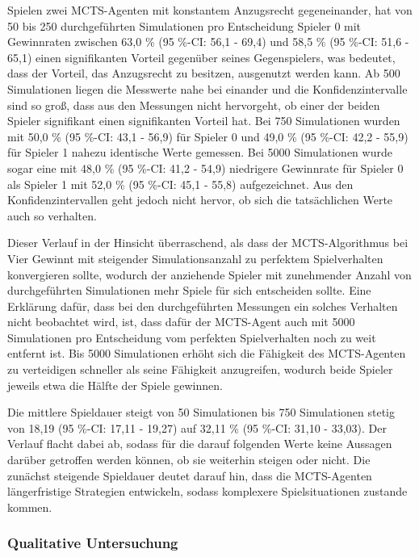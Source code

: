 Spielen zwei MCTS-Agenten mit konstantem Anzugsrecht gegeneinander, hat von 50 bis 250 durchgeführten Simulationen pro Entscheidung Spieler 0 mit Gewinnraten zwischen 63,0 \% (95 \%-CI: 56,1 - 69,4) und 58,5 \% (95 \%-CI: 51,6 - 65,1) einen signifikanten Vorteil gegenüber seines Gegenspielers, was bedeutet, dass der Vorteil, das Anzugsrecht zu besitzen, ausgenutzt werden kann. Ab 500 Simulationen liegen die Messwerte nahe bei einander und die Konfidenzintervalle sind so groß, dass aus den Messungen nicht hervorgeht, ob einer der beiden Spieler signifikant einen signifikanten Vorteil hat. Bei 750 Simulationen wurden mit 50,0 \% (95 \%-CI: 43,1 - 56,9) für Spieler 0 und 49,0 \% (95 \%-CI: 42,2 - 55,9) für Spieler 1 nahezu identische Werte gemessen. Bei 5000 Simulationen wurde sogar eine mit 48,0 \% (95 \%-CI: 41,2 - 54,9) niedrigere Gewinnrate für Spieler 0 als Spieler 1 mit 52,0 \% (95 \%-CI: 45,1 - 55,8) aufgezeichnet. Aus den Konfidenzintervallen geht jedoch nicht hervor, ob sich die tatsächlichen Werte auch so verhalten.

Dieser Verlauf in der Hinsicht überraschend, als dass der MCTS-Algorithmus bei Vier Gewinnt mit steigender Simulationsanzahl zu perfektem Spielverhalten konvergieren sollte, wodurch der anziehende Spieler mit zunehmender Anzahl von durchgeführten Simulationen mehr Spiele für sich entscheiden sollte. Eine Erklärung dafür, dass bei den durchgeführten Messungen ein solches Verhalten nicht beobachtet wird, ist, dass dafür der MCTS-Agent auch mit 5000 Simulationen pro Entscheidung vom perfekten Spielverhalten noch zu weit entfernt ist. Bis 5000 Simulationen erhöht sich die Fähigkeit des MCTS-Agenten zu verteidigen schneller als seine Fähigkeit anzugreifen, wodurch beide Spieler jeweils etwa die Hälfte der Spiele gewinnen.

Die mittlere Spieldauer steigt von 50 Simulationen bis 750 Simulationen stetig von 18,19 (95 \%-CI: 17,11 - 19,27) auf 32,11 \% (95 \%-CI: 31,10 - 33,03). Der Verlauf flacht dabei ab, sodass für die darauf folgenden Werte keine Aussagen darüber getroffen werden können, ob sie weiterhin steigen oder nicht. Die zunächst steigende Spieldauer deutet darauf hin, dass die MCTS-Agenten längerfristige Strategien entwickeln, sodass komplexere Spielsituationen zustande kommen.

\subsubsection{Qualitative Untersuchung}

